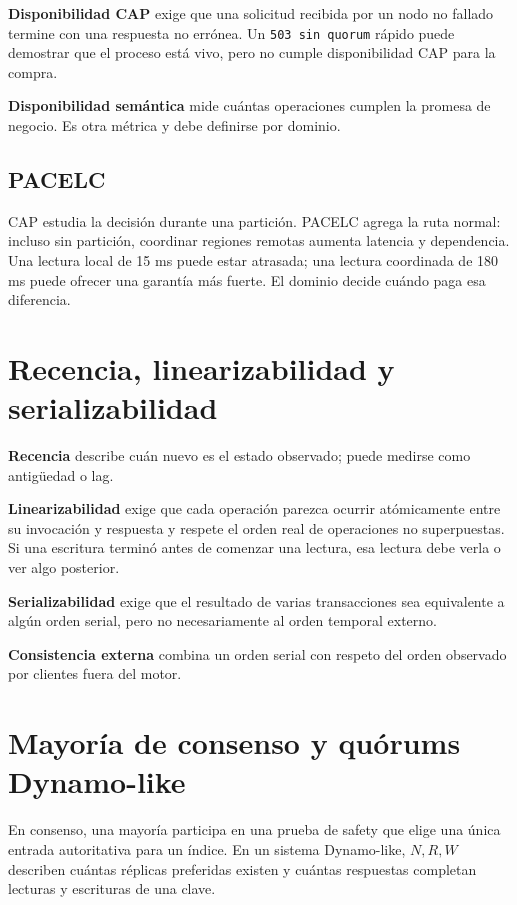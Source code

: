 \documentclass[variant=apuntes,cover=institutional,mode=screen]{ua-engineering-v6-article}
\begin{document}
\textbf{Disponibilidad CAP} exige que una solicitud recibida por un nodo no fallado termine con una respuesta no errónea. Un \texttt{503 sin quorum} rápido puede demostrar que el proceso está vivo, pero no cumple disponibilidad CAP para la compra.

\textbf{Disponibilidad semántica} mide cuántas operaciones cumplen la promesa de negocio. Es otra métrica y debe definirse por dominio.

\subsection{PACELC}

CAP estudia la decisión durante una partición. PACELC agrega la ruta normal: incluso sin partición, coordinar regiones remotas aumenta latencia y dependencia. Una lectura local de 15 ms puede estar atrasada; una lectura coordinada de 180 ms puede ofrecer una garantía más fuerte. El dominio decide cuándo paga esa diferencia.

\section{Recencia, linearizabilidad y serializabilidad}

\textbf{Recencia} describe cuán nuevo es el estado observado; puede medirse como antigüedad o lag.

\textbf{Linearizabilidad} exige que cada operación parezca ocurrir atómicamente entre su invocación y respuesta y respete el orden real de operaciones no superpuestas. Si una escritura terminó antes de comenzar una lectura, esa lectura debe verla o ver algo posterior.

\textbf{Serializabilidad} exige que el resultado de varias transacciones sea equivalente a algún orden serial, pero no necesariamente al orden temporal externo.

\textbf{Consistencia externa} combina un orden serial con respeto del orden observado por clientes fuera del motor.

\section{Mayoría de consenso y quórums Dynamo-like}

En consenso, una mayoría participa en una prueba de safety que elige una única entrada autoritativa para un índice. En un sistema Dynamo-like, \(N,R,W\) describen cuántas réplicas preferidas existen y cuántas respuestas completan lecturas y escrituras de una clave.
\end{document}
